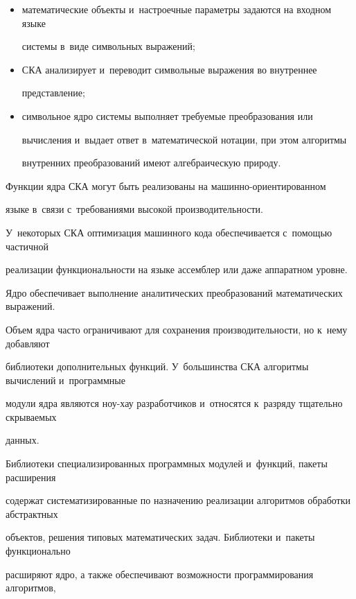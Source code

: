 \begin{itemize}

\item     математические объекты и~настроечные параметры задаются на входном языке 

системы в~виде символьных выражений;



\item     СКА анализирует и~переводит символьные выражения во внутреннее 

представление;



\item    символьное ядро системы выполняет требуемые преобразования или 

вычисления и~выдает ответ в~математической нотации, при этом алгоритмы 

внутренних преобразований имеют алгебраическую природу.

\end{itemize}



Функции ядра СКА могут быть реализованы на ма\-шин\-но-ори\-ен\-ти\-ро\-ван\-ном 

языке в~связи с~требованиями  высокой производительности. 

У~некоторых СКА оптимизация машинного кода обеспечивается с~помощью частичной 

реализации функциональности на языке ассемблер или даже аппаратном уровне. 

Ядро обеспечивает выполнение аналитических преобразований математических выражений. 

Объем ядра часто ограничивают для сохранения производительности, но к~нему добавляют 

библиотеки дополнительных функций. У~большинства СКА алгоритмы вычислений и~программные 

модули ядра являются ноу-хау разработчиков и~относятся к~разряду тщательно скрываемых 

данных.



Библиотеки специализированных программных модулей и~функций, пакеты расширения 

содержат систематизированные по назначению реализации алгоритмов обработки абстрактных 

объектов, решения типовых математических задач. Библиотеки и~пакеты функционально 

расширяют ядро, а также обеспечивают возможности программирования алгоритмов, 

